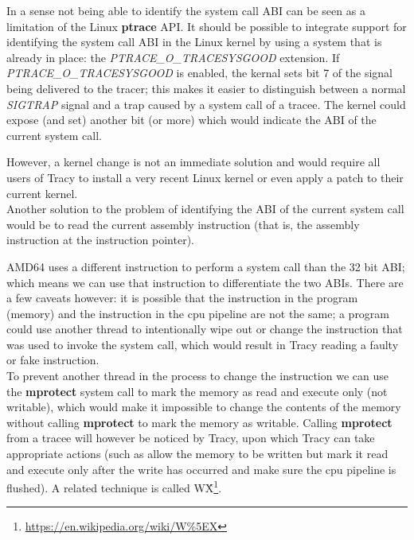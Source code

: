 \documentclass[a4paper, 10pt]{report}
\begin{document}
In a sense not being able to identify the system call ABI can be seen as a
limitation of the Linux \textbf{ptrace} API. It should be possible to
integrate support for identifying the system call ABI in the Linux kernel
by using a system that is already in place: the \textit{PTRACE\_O\_TRACESYSGOOD}
extension. If \textit{PTRACE\_O\_TRACESYSGOOD} is enabled, the kernal sets bit 7
of the signal being delivered to the tracer; this makes it easier to distinguish
between a normal \textit{SIGTRAP} signal and a trap caused by a system call of
a tracee. The kernel could expose (and set) another bit (or more) which would
indicate the ABI of the current system call.

However, a kernel change is not an immediate solution and would require all
users of Tracy to install a very recent Linux kernel or even apply a patch
to their current kernel. \\

Another solution to the problem of identifying the ABI of the current
system call would be to read the current assembly instruction (that is,
the assembly instruction at the instruction pointer).

AMD64 uses a
different instruction to perform a system call than the 32 bit ABI; which
means we can use that instruction to differentiate the two ABIs. There are a
few caveats however: it is possible that the instruction in the program (memory)
and the instruction in the cpu pipeline are not the same; a program could use
another thread to intentionally wipe out or change the instruction that was
used to invoke the system call, which would result in Tracy reading a faulty
or fake instruction. \\

To prevent another thread in the process to change the instruction we can
use the \textbf{mprotect} system call to mark the memory as read and execute
only (not writable), which would make it impossible to change the contents of
the memory without calling \textbf{mprotect} to mark the memory as writable.
Calling \textbf{mprotect} from a tracee will however be noticed by Tracy,
upon which Tracy can take appropriate actions (such as allow the memory to be
written but mark it read and execute only after the write has occurred and make
sure the cpu pipeline is flushed). A related technique is called W\^X\footnote{
\url{https://en.wikipedia.org/wiki/W\%5EX}}.
\end{document}
